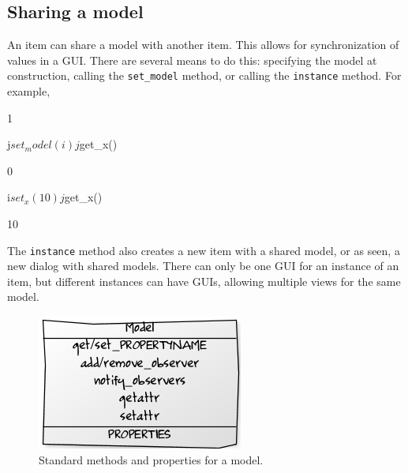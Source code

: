 \documentclass{article}
\newcommand{\code}[1]{\texttt{#1}} %
\newcommand{\generic}[1]{\code{#1}} %
\newcommand{\meth}[1]{\generic{#1}}     %
\begin{document}
\subsection{Sharing a model}
\label{sec:sharing-model}
An item can share a model with another item. This allows for
synchronization of values in a GUI. There are several means to do
this: specifying the model at construction, calling the
\meth{set\_model} method, or calling the \meth{instance} method. For example,
\begin{Schunk}
\begin{Soutput}
[1] 1
\end{Soutput}
\begin{Sinput}
 j$set_model(i)
 j$get_x()
\end{Sinput}
\begin{Soutput}
[1] 0
\end{Soutput}
\begin{Sinput}
 i$set_x(10)
 j$get_x()
\end{Sinput}
\begin{Soutput}
[1] 10
\end{Soutput}
\end{Schunk}

The \meth{instance} method also creates a new item with a shared
model, or as seen, a new dialog with shared models. There can only be
one GUI for an instance of an item, but different instances can have
GUIs, allowing multiple views for the same model.




\begin{figure}
  \centering
  \includegraphics[]{uml-model}
  \caption{Standard methods and properties for a model.}
  \label{fig:uml-model}
\end{figure}
\end{document}
